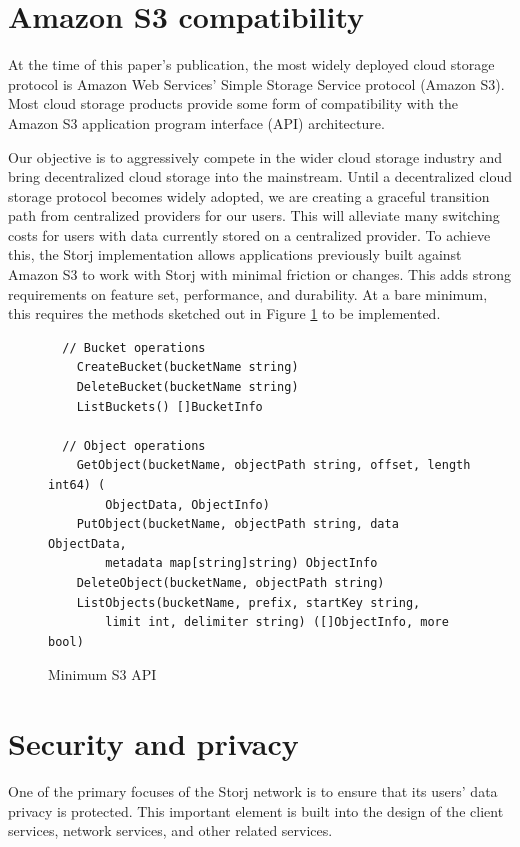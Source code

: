 \documentclass[11pt,fleqn,openany]{book}
\begin{document}
\section{Amazon S3 compatibility}

At the time of this paper's publication, the most widely deployed cloud storage
protocol is Amazon Web Services' Simple Storage Service protocol (Amazon S3).
Most cloud storage products provide some form of compatibility with the
Amazon S3 application program interface (API) architecture.

Our objective is to aggressively compete in the wider cloud
storage industry and bring decentralized cloud storage into the mainstream.
Until a decentralized cloud storage protocol becomes widely adopted,
we are creating a graceful transition path from centralized
providers for our users.
This will alleviate many switching costs for users with data currently stored on
a centralized provider.
To achieve this, the Storj implementation allows
applications previously built against Amazon S3 to work with Storj with
minimal friction or changes.
This adds strong requirements on feature set, performance, and durability.
At a bare minimum, this requires the methods sketched out in
Figure \ref{fig:s3-api-code} to be implemented.

\begin{figure}
\lstset{language=Golang}
\begin{lstlisting}
  // Bucket operations
	CreateBucket(bucketName string)
	DeleteBucket(bucketName string)
	ListBuckets() []BucketInfo

  // Object operations
	GetObject(bucketName, objectPath string, offset, length int64) (
	    ObjectData, ObjectInfo)
	PutObject(bucketName, objectPath string, data ObjectData,
	    metadata map[string]string) ObjectInfo
	DeleteObject(bucketName, objectPath string)
	ListObjects(bucketName, prefix, startKey string,
	    limit int, delimiter string) ([]ObjectInfo, more bool)
\end{lstlisting}
\caption{Minimum S3 API}
\label{fig:s3-api-code}
\end{figure}

\section{Security and privacy}

One of the primary focuses of the Storj network is to ensure that its users'
data privacy is protected. This important element is
built into the design of the client services, network services, and other related services.
\end{document}
